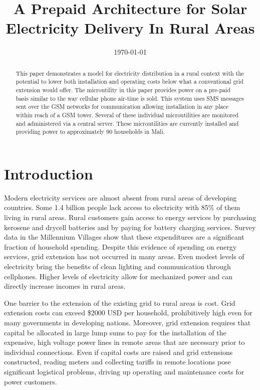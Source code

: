 \documentclass{sig-alternate}
\begin{document}

\title{A Prepaid Architecture for Solar Electricity Delivery In Rural Areas}
\date{\today}
\maketitle

\begin{abstract}
This paper demonstrates a model for electricity
distribution in a rural context with the potential
to lower both installation and operating costs below
what a conventional grid extension would offer.
The microutility in this paper provides power on a
pre-paid basis similar to the way cellular phone
air-time is sold.
This system uses SMS messages sent 
over the GSM networks
for communication allowing installation in any place
within reach of a GSM tower.
Several of these individual microutilities are monitored
and administered via a central server.
These microutilities are currently installed and providing
power to approximately 90 households in Mali.
\end{abstract}

\section{Introduction}
Modern electricity services are almost absent from rural
areas of developing countries.
Some 1.4 billion people lack access to electricity with 85\% of
them living in rural areas.\cite{WEO2010}
Rural customers gain access to energy services by purchasing
kerosene and drycell batteries and by paying for battery charging
services.
Survey data in the Millennium Villages show that these expenditures
are a significant fraction of household spending.\cite{MVPEnergy}
Despite this evidence of spending on energy services,
grid extension has not occurred in many areas.
Even modest levels of electricity bring the benefits of clean lighting
and communication through cellphones.\cite{Cabraal:2005}
Higher levels of electricity allow for mechanized power and can
directly increase incomes in rural areas.\cite{Kirubi:2009}

One barrier to the extension of the existing grid to rural areas is cost.
Grid extension costs can exceed \$2000 USD per household, prohibitively
high even for many governments in developing
nations.\cite{ModiPlanningKenya}
Moreover, grid extension requires that capital be allocated in large
lump sums to pay for the installation of the expensive, high voltage power
lines in remote areas that are necessary prior to individual connections.
Even if capital costs are raised and grid extensions constructed,
reading meters and collecting tariffs in remote locations pose
significant logistical problems, driving up operating and maintenance
costs for power customers.
\end{document}
